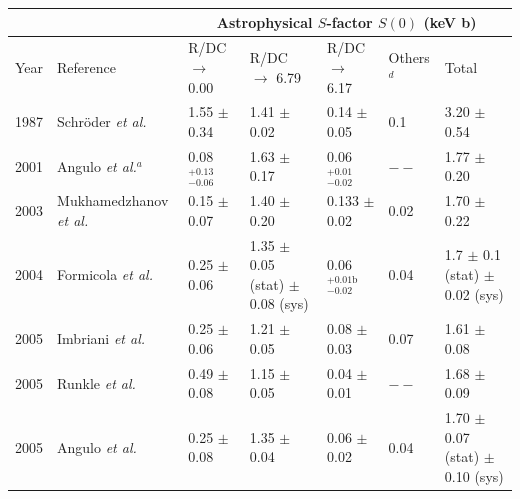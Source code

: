 \begin{table}
\begin{tabular}{@{}lllllll@{}}
\toprule
     &                                                          & \multicolumn{5}{c}{Astrophysical $S$-factor $S(0)$ (keV b)}                                                                                                                               \\ \midrule
Year & Reference                                                & R/DC $\rightarrow$ 0.00                         & R/DC $\rightarrow$ 6.79                 & R/DC $\rightarrow$ 6.17        & Others$^{d}$ & Total                                         \\
\hline
1987 & Schr{\"o}der \textit{et al.} \cite{Schroder1987}          & 1.55 $\pm$ 0.34                                 & 1.41 $\pm$ 0.02                         & 0.14 $\pm$ 0.05                & 0.1          & 3.20 $\pm$ 0.54                               \\
2001 & Angulo \textit{et al.}$^{a}$ \cite{Angulo2001}            & 0.08$^{+0.13}_{-0.06}$                          & 1.63 $\pm$ 0.17                         & 0.06$^{+0.01}_{-0.02}$          & $--$         & 1.77 $\pm$ 0.20                               \\
2003 & Mukhamedzhanov \textit{et al.} \cite{Mukhamedzhanov2003} & 0.15 $\pm$ 0.07                                 & 1.40 $\pm$ 0.20                         & 0.133 $\pm$ 0.02               & 0.02         & 1.70 $\pm$ 0.22                               \\
2004 & Formicola \textit{et al.} \cite{Formicola2004}            & 0.25 $\pm$ 0.06                                 & 1.35 $\pm$ 0.05 (stat) $\pm$ 0.08 (sys) & 0.06$^{+0.01 \text{b}}_{-0.02}$ & 0.04         & 1.7 $\pm$ 0.1 (stat) $\pm$ 0.02 (sys)         \\
2005 & Imbriani \textit{et al.} \cite{Imbriani2005}              & 0.25 $\pm$ 0.06                                 & 1.21 $\pm$ 0.05                         & 0.08 $\pm$ 0.03                & 0.07         & 1.61 $\pm$ 0.08                               \\
2005 & Runkle \textit{et al.} \cite{Runkle2005}                  & 0.49 $\pm$ 0.08                                 & 1.15 $\pm$ 0.05                         & 0.04 $\pm$ 0.01                & $--$         & 1.68 $\pm$ 0.09                               \\
2005 & Angulo \textit{et al.} \cite{Angulo2005}                  & 0.25 $\pm$ 0.08                                 & 1.35 $\pm$ 0.04                         & 0.06 $\pm$ 0.02                & 0.04         & 1.70 $\pm$ 0.07 (stat) $\pm$ 0.10 (sys)       \\

\end{tabular}
\end{table}
